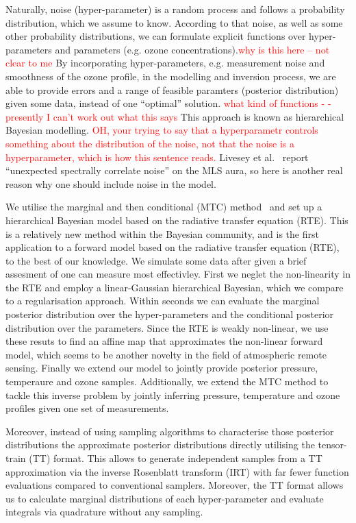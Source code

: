Naturally, noise (hyper-parameter) is a random process and follows a probability distribution, which we assume to know.
According to that noise, as well as some other probability distributions, we can formulate explicit functions over hyper-parameters and parameters (e.g. ozone concentrations).\textcolor{red}{why is this here -- not clear to me}
By incorporating hyper-parameters, e.g. measurement noise and smoothness of the ozone profile, in the modelling and inversion process, we are able to provide errors and a range of feasible paramters (posterior distribution) given some data, instead of one ``optimal'' solution.\textcolor{red}{ what kind of functions - -presently I can't work out what this says}
This approach is known as hierarchical Bayesian modelling.\textcolor{red}{  OH, your trying to say that a hyperparametr controls something about the distribution of the noise, not that the noise is a hyperparameter, which is how this sentence reads.}
Livesey et al.~\cite{livesey2006retrieval} report ``unexpected spectrally correlate noise'' on the MLS aura, so here is another real reason why one should include noise in the model.

We utilise the marginal and then conditional (MTC) method~\cite{fox2016fast} 
and set up a hierarchical Bayesian model based on the radiative transfer equation (RTE).
This is a relatively new method within the Bayesian community, and is the first application to a forward model based on the radiative transfer equation (RTE), to the best of our knowledge.
We simulate some data after given a brief assesment of one can measure most effectivley.
First we neglet the non-linearity in the RTE and employ a linear-Gaussian hierarchical Bayesian, which we compare to a regularisation approach.
Within seconds we can evaluate the marginal posterior distribution over the hyper-parameters and the conditional posterior distribution over the parameters.
Since the RTE is weakly non-linear, we use these resuts to find an affine map that approximates the non-linear forward model, which seems to be another novelty in the field of atmospheric remote sensing.
Finally we extend our model to jointly provide posterior pressure, temperaure and ozone samples.
Additionally, we extend the MTC method to tackle this inverse problem by jointly inferring pressure, temperature and ozone profiles given one set of measurements.

Moreover, instead of using sampling algorithms to characterise those posterior distributions the approximate posterior distributions directly utilising the tensor-train (TT) format. 
This allows to generate independent samples from a TT approximation via the inverse Rosenblatt transform (IRT) with far fewer function evaluations compared to conventional samplers.
Moreover, the TT format allows us to calculate marginal distributions of each hyper-parameter and evaluate integrals via quadrature without any sampling.


